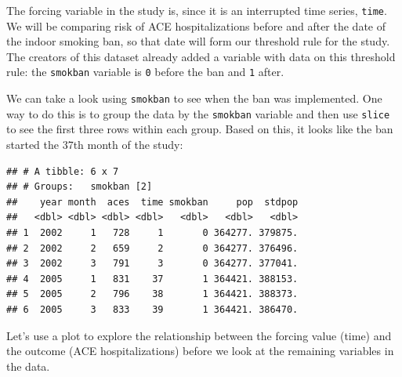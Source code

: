 \documentclass[
]{book}
\newenvironment{Shaded}{\begin{snugshade}}{\end{snugshade}}
\newcommand{\DecValTok}[1]{\textcolor[rgb]{0.00,0.00,0.81}{#1}}
\newcommand{\KeywordTok}[1]{\textcolor[rgb]{0.13,0.29,0.53}{\textbf{#1}}}
\newcommand{\NormalTok}[1]{#1}
\newcommand{\OperatorTok}[1]{\textcolor[rgb]{0.81,0.36,0.00}{\textbf{#1}}}
\newcommand{\StringTok}[1]{\textcolor[rgb]{0.31,0.60,0.02}{#1}}
\begin{document}
The forcing variable in the study is, since it is an interrupted time series, \texttt{time}. We will be comparing risk of ACE hospitalizations before and after the date of the indoor smoking ban, so that date will form our threshold rule for the study. The creators of this dataset already added a variable with data on this threshold rule: the \texttt{smokban} variable is \texttt{0} before the ban and \texttt{1} after.

We can take a look using \texttt{smokban} to see when the ban was implemented. One
way to do this is to group the data by the \texttt{smokban} variable and then use \texttt{slice} to see the first three rows within each group. Based on this, it looks like the ban started the 37th month of the study:

\begin{Shaded}
\end{Shaded}

\begin{verbatim}
## # A tibble: 6 x 7
## # Groups:   smokban [2]
##    year month  aces  time smokban     pop  stdpop
##   <dbl> <dbl> <dbl> <dbl>   <dbl>   <dbl>   <dbl>
## 1  2002     1   728     1       0 364277. 379875.
## 2  2002     2   659     2       0 364277. 376496.
## 3  2002     3   791     3       0 364277. 377041.
## 4  2005     1   831    37       1 364421. 388153.
## 5  2005     2   796    38       1 364421. 388373.
## 6  2005     3   833    39       1 364421. 386470.
\end{verbatim}

Let's use a plot to explore the relationship between the forcing value (time) and the outcome (ACE hospitalizations) before we look at the remaining variables in the data.
\end{document}
